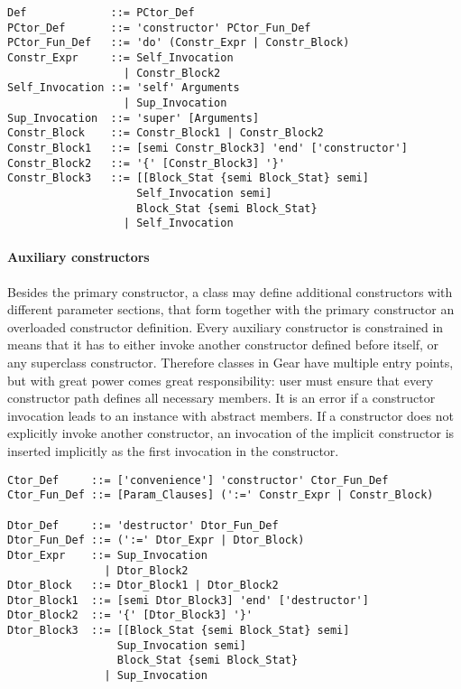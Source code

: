 \syntax\begin{lstlisting}
Def             ::= PCtor_Def
PCtor_Def       ::= 'constructor' PCtor_Fun_Def
PCtor_Fun_Def   ::= 'do' (Constr_Expr | Constr_Block)
Constr_Expr     ::= Self_Invocation
                  | Constr_Block2
Self_Invocation ::= 'self' Arguments
                  | Sup_Invocation
Sup_Invocation  ::= 'super' [Arguments]
Constr_Block    ::= Constr_Block1 | Constr_Block2
Constr_Block1   ::= [semi Constr_Block3] 'end' ['constructor']
Constr_Block2   ::= '{' [Constr_Block3] '}'
Constr_Block3   ::= [[Block_Stat {semi Block_Stat} semi] 
                    Self_Invocation semi] 
                    Block_Stat {semi Block_Stat}
                  | Self_Invocation
\end{lstlisting}

\paragraph{Auxiliary constructors}
Besides the primary constructor, a class may define additional constructors with different parameter sections, that form together with the primary constructor an overloaded constructor definition. Every auxiliary constructor is constrained in means that it has to either invoke another constructor defined before itself, or any superclass constructor. Therefore classes in Gear have multiple entry points, but with great power comes great responsibility: user must ensure that every constructor path defines all necessary members. It is an error if a constructor invocation leads to an instance with abstract members. If a constructor does not explicitly invoke another constructor, an invocation of the implicit constructor is inserted implicitly as the first invocation in the constructor. 

\syntax\begin{lstlisting}
Ctor_Def     ::= ['convenience'] 'constructor' Ctor_Fun_Def
Ctor_Fun_Def ::= [Param_Clauses] (':=' Constr_Expr | Constr_Block)

Dtor_Def     ::= 'destructor' Dtor_Fun_Def
Dtor_Fun_Def ::= (':=' Dtor_Expr | Dtor_Block)
Dtor_Expr    ::= Sup_Invocation
               | Dtor_Block2
Dtor_Block   ::= Dtor_Block1 | Dtor_Block2
Dtor_Block1  ::= [semi Dtor_Block3] 'end' ['destructor']
Dtor_Block2  ::= '{' [Dtor_Block3] '}'
Dtor_Block3  ::= [[Block_Stat {semi Block_Stat} semi] 
                 Sup_Invocation semi] 
                 Block_Stat {semi Block_Stat}
               | Sup_Invocation
\end{lstlisting}

